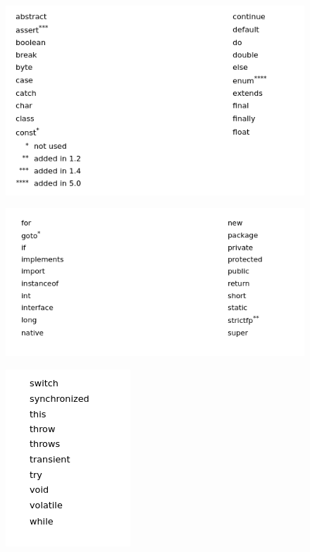 \documentclass[11]{article}
\begin{document}
\begin{figure}[H]
	\centering
	\includegraphics[scale=0.5]{keywords1.png}
	\label{keywords}
\end{figure}

\begin{figure}[H]
	\centering
	\includegraphics[scale=0.5]{keywords2.png}
\end{figure}

\begin{figure}[H]
	\centering
	\includegraphics[scale=0.5]{keywords3.png}
\end{figure}
\end{document}
